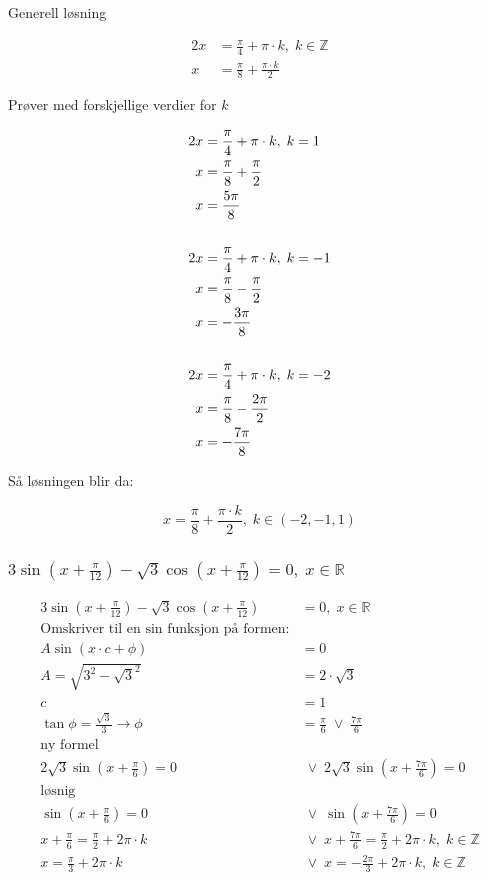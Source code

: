 \documentclass{article}
\begin{document}
Generell løsning

\begin{align*}
    2x &= \frac{\pi}{4} + \pi \cdot k, \; k \in \mathbb{Z} \\
    x &= \frac{\pi}{8} + \frac{\pi \cdot k}{2}
\end{align*}

Prøver med forskjellige verdier for $k$

\begin{align*}
    2x &= \frac{\pi}{4} + \pi \cdot k, \; k = 1 \\
    x &= \frac{\pi}{8} + \frac{\pi}{2} \\
    x &= \frac{5\pi}{8} \\
    \newline \\
    2x &= \frac{\pi}{4} + \pi \cdot k, \; k = -1 \\
    x &= \frac{\pi}{8} - \frac{\pi}{2} \\
    x &= -\frac{3\pi}{8} \\
    \newline \\
    2x &= \frac{\pi}{4} + \pi \cdot k, \; k = -2 \\
    x &= \frac{\pi}{8} - \frac{2\pi}{2} \\
    x &= -\frac{7\pi}{8} \\
\end{align*}

Så løsningen blir da:

$$ x = \frac{\pi}{8} + \frac{\pi \cdot k}{2}, \; k \in (-2, -1, 1) $$

\subsubsection{$3 \sin(x + \frac{\pi}{12}) - \sqrt{3} \cos (x+\frac{\pi}{12})=0, \; x\in\mathbb{R}$}

\begin{align*}
    3 \sin(x + \frac{\pi}{12}) - \sqrt{3} \cos (x+\frac{\pi}{12}) &= 0, \; x\in\mathbb{R} \\
    \text{Omskriver til en sin funksjon på formen:} \\
    A \sin (x \cdot c+\phi) &= 0 \\
    A = \sqrt{3^2 - \sqrt{3}^2} &= 2 \cdot \sqrt{3} \\
    c &= 1 \\
    \tan \phi = \frac{\sqrt{3}}{3} \rightarrow \phi &= \frac{\pi}{6} \;\lor\; \frac{7\pi}{6} \\
    \text{ny formel} \\
    2\sqrt3 \sin (x+\frac{\pi}{6}) = 0 &\;\lor\; 2\sqrt{3} \sin (x+\frac{7\pi}{6}) = 0 \\
    \text{løsnig} \\
    \sin (x+\frac{\pi}{6}) = 0 &\;\lor\; \sin (x+\frac{7\pi}{6}) = 0 \\
    x+\frac{\pi}{6} = \frac{\pi}{2} + 2\pi \cdot k &\;\lor\; x+\frac{7\pi}{6} = \frac{\pi}{2} + 2\pi \cdot k, \; k\in\mathbb{Z} \\
    x = \frac{\pi}{3} + 2\pi \cdot k &\;\lor\; x = -\frac{2\pi}{3} + 2\pi \cdot k, \; k\in\mathbb{Z}
\end{align*}
\end{document}
